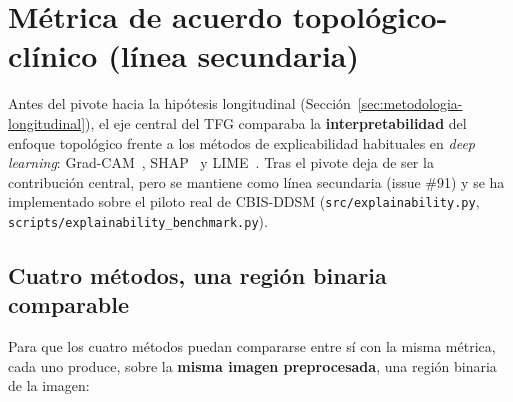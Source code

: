\section{Métrica de acuerdo topológico-clínico (línea secundaria)}
\label{sec:metrica-acuerdo}
Antes del pivote hacia la hipótesis longitudinal (Sección~\ref{sec:metodologia-longitudinal}),
el eje central del TFG comparaba la \textbf{interpretabilidad} del enfoque
topológico frente a los métodos de explicabilidad habituales en \textit{deep
learning}: Grad-CAM~\cite{selvaraju2017gradcam}, SHAP~\cite{lundberg2017shap}
y LIME~\cite{ribeiro2016lime}. Tras el pivote deja de ser la contribución
central, pero se mantiene como línea secundaria (issue \#91) y se ha
implementado sobre el piloto real de \mbox{CBIS-DDSM}
(\texttt{src/explainability.py}, \texttt{scripts/explainability\_benchmark.py}).

\subsection{Cuatro métodos, una región binaria comparable}
Para que los cuatro métodos puedan compararse entre sí con la misma métrica,
cada uno produce, sobre la \textbf{misma imagen preprocesada}, una región
binaria de la imagen:

